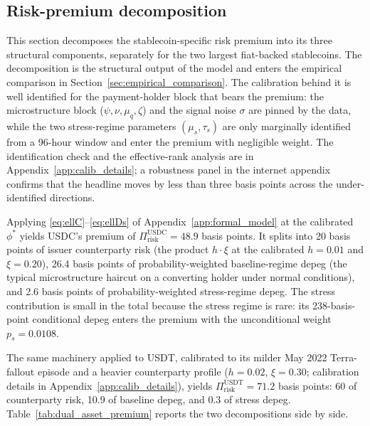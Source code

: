 \subsection{Risk-premium decomposition}\label{sec:identification}

This section decomposes the stablecoin-specific risk premium into its three structural components, separately for the two largest fiat-backed stablecoins. The decomposition is the structural output of the model and enters the empirical comparison in Section~\ref{sec:empirical_comparison}. The calibration behind it is well identified for the payment-holder block that bears the premium: the microstructure block ($\psi, \nu, \mu_q, \zeta$) and the signal noise $\sigma$ are pinned by the data, while the two stress-regime parameters $(\mu_s, \tau_s)$ are only marginally identified from a 96-hour window and enter the premium with negligible weight. The identification check and the effective-rank analysis are in Appendix~\ref{app:calib_details}; a robustness panel in the internet appendix confirms that the headline moves by less than three basis points across the under-identified directions.

Applying \eqref{eq:ellC}--\eqref{eq:ellDs} of Appendix~\ref{app:formal_model} at the calibrated $\phi^*$ yields USDC's premium of $\Pi_{\text{risk}}^{\text{USDC}} = 48.9$ basis points. It splits into 20 basis points of issuer counterparty risk (the product $h \cdot \xi$ at the calibrated $h = 0.01$ and $\xi = 0.20$), 26.4 basis points of probability-weighted baseline-regime depeg (the typical microstructure haircut on a converting holder under normal conditions), and 2.6 basis points of probability-weighted stress-regime depeg. The stress contribution is small in the total because the stress regime is rare: its 238-basis-point conditional depeg enters the premium with the unconditional weight $p_s = 0.0108$.

The same machinery applied to USDT, calibrated to its milder May 2022 Terra-fallout episode and a heavier counterparty profile ($h = 0.02$, $\xi = 0.30$; calibration details in Appendix~\ref{app:calib_details}), yields $\Pi_{\text{risk}}^{\text{USDT}} = 71.2$ basis points: 60 of counterparty risk, 10.9 of baseline depeg, and 0.3 of stress depeg. Table~\ref{tab:dual_asset_premium} reports the two decompositions side by side.

